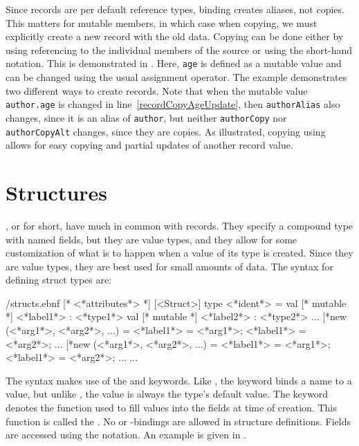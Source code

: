 Since records are per default reference types, binding creates aliases, not copies. This matters for mutable members, in which case when copying, we must explicitly create a new record with the old data. Copying can be done either by using referencing to the individual members of the source or using the short-hand  notation. This is demonstrated in .
%
%
Here, \lstinline{age} is defined as a mutable value and can be changed using the usual \lexeme{<-} assignment operator. The example demonstrates two different ways to create records. Note that when the mutable value \lstinline{author.age} is changed in line~\ref{recordCopyAgeUpdate}, then \lstinline{authorAlias} also changes, since it is an alias of \lstinline{author}, but neither \lstinline{authorCopy} nor \lstinline{authorCopyAlt} changes, since they are copies. As illustrated, copying using  allows for easy copying and partial updates of another record value.

\section{Structures}
\label{sec:structs}
, or  for short, have much in common with records. They specify a compound type with named fields, but they are value types, and they allow for some customization of what is to happen when a value of its type is created. Since they are value types, they are best used for small amounts of data. The syntax for defining struct types are:
%
\begin{verbatimwrite}{\ebnf/structs.ebnf}
[* <*attributes*> *] 
[<Struct>] 
type <*ident*> =
  val [* mutable *] <*label1*> : <*type1*>
  val [* mutable *] <*label2*> : <*type2*>
  ...
  [*new (<*arg1*>, <*arg2*>, ...) = {<*label1*> = <*arg1*>; <*label1*> = <*arg2*>; ...}
  [*new (<*arg1*>, <*arg2*>, ...) = {<*label1*> = <*arg1*>; <*label1*> = <*arg2*>; ...}
  ...
\end{verbatimwrite}
%
The syntax makes use of the  and  keywords. Like , the keyword  binds a name to a value, but unlike , the value is always the type's default value. The  keyword denotes the function used to fill values into the fields at time of creation. This function is called the . No  or -bindings are allowed in structure definitions. Fields are accessed using the  notation. An example is given in .
%
%

